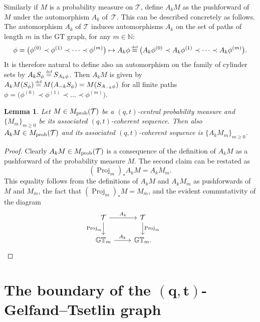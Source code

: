 \documentclass[pdftex]{sigma}
\numberwithin{equation}{section}
\newcommand\myeq{\mathrel{\stackrel{\makebox[0pt]{\mbox{\normalfont\tiny def}}}{=}}}
\newtheorem{lem}[thm]{Lemma}
\newcommand{\N}{\mathbb{N}}
\newcommand{\GT}{\mathbb{GT}}
\newcommand{\Tau}{\mathcal{T}}
\begin{document}
Similarly if $M$ is a probability measure on $\Tau$, def\/ine $A_k M$ as the pushforward of $M$ under the automorphism $A_k$ of~$\Tau$. This can be described concretely as follows. The automorphism $A_k$ of $\Tau$ induces automorphisms $A_k$ on the set of paths of length $m$ in the GT graph, for any $m\in\N$:
\begin{gather*}
\phi = \big(\phi^{(0)} \prec \phi^{(1)} \prec \cdots \prec \phi^{(m)}\big) \mapsto A_k\phi \myeq \big(A_k\phi^{(0)} \prec A_k\phi^{(1)} \prec \cdots \prec A_k\phi^{(m)}\big).
\end{gather*}
It is therefore natural to def\/ine also an automorphism on the family of cylinder sets by $A_k S_{\phi} \myeq S_{A_k \phi}$.
Then $A_k M$ is given by $A_k M(S_{\phi}) \myeq M(A_{-k}S_{\phi}) = M(S_{A_{-k}\phi})$ for all f\/inite paths $\phi = \big(\phi^{(0)} \prec \phi^{(1)} \prec \dots \prec \phi^{(m)}\big)$.

\begin{lem}\label{lem:qtcoherency}
Let $M\in M_{\rm prob}(\Tau)$ be a $(q, t)$-central probability measure and $\{M_m\}_{m\geq 0}$ be its associated $(q, t)$-coherent sequence. Then also $A_k M\in M_{\rm prob}(\Tau)$ and its associated $(q, t)$-coherent sequence is $\{A_k M_m\}_{m\geq 0}$.
\end{lem}
\begin{proof}
Clearly $A_k M\in M_{\rm prob}(\Tau)$ is a consequence of the def\/inition of $A_k M$ as a pushforward of the probability measure $M$.
The second claim can be restated as
\[
(\operatorname{Proj}_m)_* A_kM = A_k M_m.
\]
This equality follows from the def\/initions of $A_kM$ and $A_kM_m$ as pushforwards of $M$ and $M_m$, the fact that $(\operatorname{Proj}_m)_* M = M_m$, and the evident commutativity of the diagram
\begin{equation*}
\begin{tikzcd}
\Tau \arrow{r}{A_k} \arrow[swap]{d}{\operatorname{Proj}_m} & \Tau \arrow{d}{\operatorname{Proj}_m} \\
\GT_m \arrow{r}{A_k} & \GT_m.
\end{tikzcd}\tag*{\qed}
\end{equation*}\renewcommand{\qed}{}
\end{proof}

\section[The boundary of the $(q, t)$-Gelfand--Tsetlin graph]{The boundary of the $\boldsymbol{(q, t)}$-Gelfand--Tsetlin graph}\label{sec:qtboundary}
\end{document}
